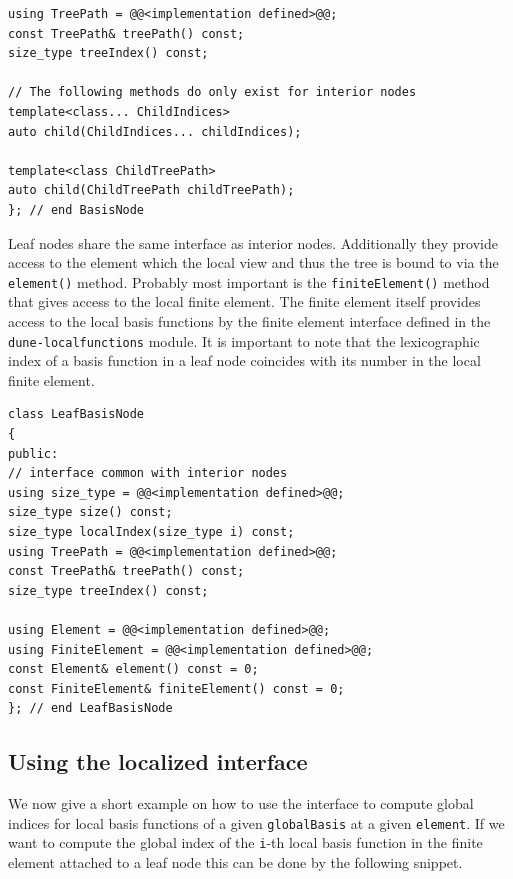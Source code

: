 \documentclass[a4paper,10pt,headings=normal,bibliography=totoc]{scrartcl}
\newcommand{\cpp}[1]{\lstinline[basicstyle=\ttfamily]!#1!}
\newcommand{\dunemodule}[1]{\texttt{#1}}
\begin{document}
\begin{lstlisting}[style=Interface]
using TreePath = @@<implementation defined>@@;
const TreePath& treePath() const;
size_type treeIndex() const;

// The following methods do only exist for interior nodes
template<class... ChildIndices>
auto child(ChildIndices... childIndices);

template<class ChildTreePath>
auto child(ChildTreePath childTreePath);
}; // end BasisNode
\end{lstlisting}

Leaf nodes share the same interface as interior
nodes. Additionally they provide access to the
element which the local view and thus the tree is bound
to via the \cpp{element()} method. Probably most important
is the \cpp{finiteElement()} method that gives access
to the local finite element. The finite element
itself provides access to the local basis functions
by the finite element interface defined in the
\dunemodule{dune-localfunctions} module.
It is important to note that the lexicographic
index of a basis function in a leaf node coincides
with its number in the local finite element.

\begin{lstlisting}[style=Interface]
class LeafBasisNode
{
public:
// interface common with interior nodes
using size_type = @@<implementation defined>@@;
size_type size() const;
size_type localIndex(size_type i) const;
using TreePath = @@<implementation defined>@@;
const TreePath& treePath() const;
size_type treeIndex() const;

using Element = @@<implementation defined>@@;
using FiniteElement = @@<implementation defined>@@;
const Element& element() const = 0;
const FiniteElement& finiteElement() const = 0;
}; // end LeafBasisNode
\end{lstlisting}



\subsection{Using the localized interface}
\label{sec:localized_interface}

We now give a short example on how to use the interface
to compute global indices for local basis functions
of a given \cpp{globalBasis} at a given \cpp{element}.
If we want to compute the global index of the \cpp{i}-th
local basis function in the finite element attached to
a leaf node this can be done by the following snippet.
\end{document}
